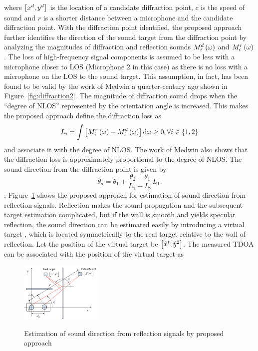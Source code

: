 \documentclass[letterpaper, 10 pt, conference]{ieeeconf}  %
\begin{document}
where $\left [ x^d, y^d \right ]$ is the location of a candidate diffraction point, $c$ is the speed of sound and $r$ is a shorter distance between a microphone and the candidate diffraction point.  
With the diffraction point identified, the proposed approach further identifies the direction of the sound target from the diffraction point by analyzing the magnitudes of diffraction and reflection sounds $M_i^d\left ( \omega \right )$ and $M_i^r\left ( \omega \right )$.  The loss of high-frequency signal components is assumed to be less with a microphone closer to LOS (Microphone 2 in this case) as there is no loss with a microphone on the LOS to the sound target.  This assumption, in fact, has been found to be valid by the work of Medwin a quarter-century ago \cite{medwin1981shadowing} shown in Figure~\ref{fig:diffraction2}.  The magnitude of diffraction sound drops when the ``degree of NLOS'' represented by the orientation angle is increased.   This makes the proposed approach define the diffraction loss as
\begin{equation}\label{eq:loss}
L_i = \int \left [ M_i^r\left ( \omega \right ) - M_i^d\left ( \omega \right ) \right ] {\rm d} \omega \geq 0, \forall i \in \left \{ 1,2 \right \}  
\end{equation}
and associate it with the degree of NLOS.  The work of Medwin also shows that the diffraction loss is approximately proportional to the degree of NLOS.  The sound direction from the diffraction point is given by
\begin{equation}\label{eq:direction_diffraction}
\theta_d = \theta_1 + \frac{\theta_2 - \theta_1}{L_1 - L_2} L_1.   
\end{equation}
: Figure~\ref{fig:reflection} shows the proposed approach for estimation of sound direction from reflection signals.  Reflection makes the sound propagation and the subsequent target estimation complicated, but if the wall is smooth and yields specular reflection, the sound direction can be estimated easily by introducing a virtual target \cite{pulkki1997}, which is located symmetrically to the real target relative to the wall of reflection.  Let the position of the virtual target be $\left [ \hat x^t, \hat y^2 \right ]$.  The measured TDOA can be associated with the position of the virtual target as\\
\begin{figure}[h]
	{\centering
		\includegraphics[width=0.35\textwidth]{Figures/reflection.png}
	}
	\caption{\footnotesize {Estimation of sound direction from reflection signals by proposed approach} }
	\label{fig:reflection}
\end{figure}
\end{document}
